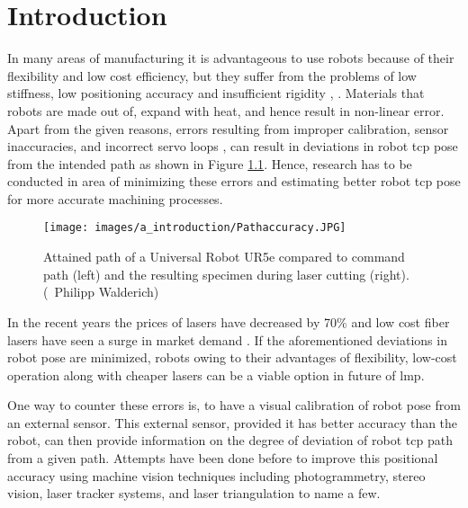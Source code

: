 \chapter{Introduction}\label{Chap:Introduction}

In many areas of manufacturing it is advantageous to use robots because of their flexibility and low cost efficiency, but they suffer from the problems of low stiffness, low positioning accuracy and insufficient rigidity \cite{ji}, \cite{chen}. Materials that robots are made out of, expand with heat, and hence result in non-linear error. Apart from the given reasons, errors resulting from improper calibration, sensor inaccuracies, and incorrect servo loops \cite{greenway}, \cite{torgny} can result in deviations in robot \Gls{tcp} pose from the intended path as shown in Figure \ref{fig:fig_walderich}. Hence, research has to be conducted in area of minimizing these errors and estimating better robot \Gls{tcp} pose for more accurate machining processes.

\vspace{5mm}


    \vspace{5mm}
    \begin{figure}[h]
        \centering
        \texttt{[image: images/a\_introduction/Pathaccuracy.JPG]}
        \caption{Attained path of a Universal Robot UR5e compared to command path (left) and the resulting specimen during laser cutting (right). (\textcopyright \ Philipp Walderich) \cite{img_walderich}}
        \label{fig:fig_walderich}
    \end{figure}
    \vspace{5mm}

    \noindent In the recent years the prices of lasers have decreased by 70\% and low cost fiber lasers have seen a surge in market demand \cite{optech}. If the aforementioned deviations in robot pose are minimized, robots owing to their advantages of flexibility, low-cost operation along with cheaper lasers can be a viable option in future of \gls{lmp}.
    
    \vspace{5mm}

    \noindent One way to counter these errors is, to have a visual calibration of robot pose from an external sensor. This external sensor, provided it has better accuracy than the robot, can then provide information on the degree of deviation of robot \gls{tcp} path from a given path. Attempts have been done before to improve this positional accuracy using machine vision techniques including photogrammetry, stereo vision, laser tracker systems, and laser triangulation to name a few. 
    
